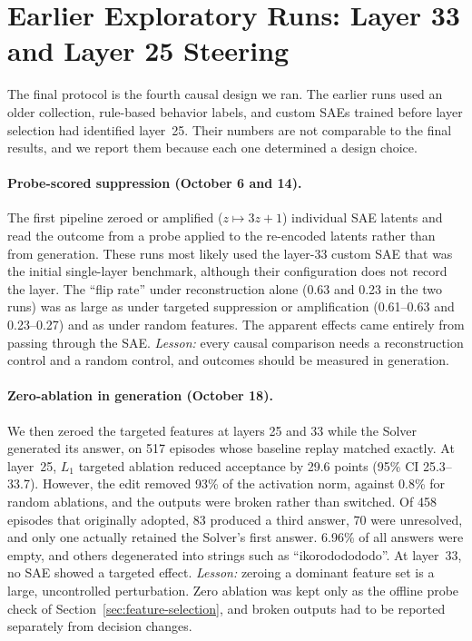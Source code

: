 \section{Earlier Exploratory Runs: Layer 33 and Layer 25 Steering}
\label{sec:res-exploratory}

The final protocol is the fourth causal design we ran. The earlier runs used
an older collection, rule-based behavior labels, and custom SAEs trained
before layer selection had identified layer~25. Their numbers are not
comparable to the final results, and we report them because each one
determined a design choice.

\paragraph{Probe-scored suppression (October 6 and 14).} The first pipeline
zeroed or amplified ($z\mapsto3z+1$) individual SAE latents and read the
outcome from a probe applied to the re-encoded latents rather than from
generation. These runs most likely used the layer-33 custom SAE that was the
initial single-layer benchmark, although their configuration does not record
the layer. The ``flip rate'' under reconstruction alone (0.63 and 0.23 in the
two runs) was as large as under targeted suppression or amplification
(0.61--0.63 and 0.23--0.27) and as under random features. The apparent
effects came entirely from passing through the SAE. \emph{Lesson:} every
causal comparison needs a reconstruction control and a random control, and
outcomes should be measured in generation.

\paragraph{Zero-ablation in generation (October 18).} We then zeroed the
targeted features at layers 25 and 33 while the Solver generated its answer,
on 517 episodes whose baseline replay matched exactly. At layer~25, $L_1$
targeted ablation reduced acceptance by 29.6 points (95\% CI 25.3--33.7).
However, the edit removed 93\% of the activation norm, against 0.8\% for
random ablations, and the outputs were broken rather than switched. Of 458
episodes that originally adopted, 83 produced a third answer, 70 were
unresolved, and only one actually retained the Solver's first answer. 6.96\%
of all answers were empty, and others degenerated into strings such as
``ikorododododo''. At layer~33, no SAE showed a targeted effect. \emph{Lesson:}
zeroing a dominant feature set is a large, uncontrolled perturbation. Zero
ablation was kept only as the offline probe check of
Section~\ref{sec:feature-selection}, and broken outputs had to be reported
separately from decision changes.

